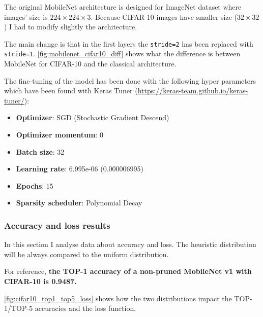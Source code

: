 The original MobileNet architecture is designed for ImageNet dataset where
images' size is $224\times224\times3$. Because CIFAR-10 images have smaller
size ($32\times32$) I had to modify slightly the architecture.

The main change is that in the first layers the \texttt{stride=2} has been
replaced with \texttt{stride=1}.
\autoref{fig:mobilenet_cifar10_diff} shows what the difference is between
MobileNet for CIFAR-10 and the classical architecture.

The fine-tuning of the model has been done with the following hyper parameters
which have been found with Keras Tuner
(\url{https://keras-team.github.io/keras-tuner/}):

\begin{itemize}
    \item \textbf{Optimizer}: SGD (Stochastic Gradient Descend)
    \item \textbf{Optimizer momentum}: 0
    \item \textbf{Batch size}: 32
    \item \textbf{Learning rate}: 6.995e-06 (0.000006995)
    \item \textbf{Epochs}: 15
    \item \textbf{Sparsity scheduler}: Polynomial Decay
\end{itemize}

\subsubsection{Accuracy and loss results}
In this section I analyse data about accuracy and loss. The heuristic
distribution will be always compared to the uniform distribution.

For reference, \textbf{the TOP-1 accuracy of a non-pruned MobileNet v1 with
CIFAR-10 is 0.9487.}

\autoref{fig:cifar10_top1_top5_loss} shows how the two distributions impact the
TOP-1/TOP-5 accuracies and the loss function.

